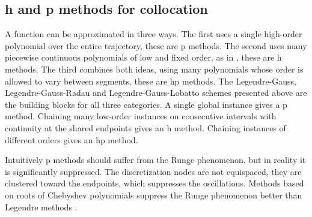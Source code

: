 \subsection{h and p methods for collocation}
A function can be approximated in three ways. The first uses a single high-order polynomial over the entire trajectory, these are p methods. The second uses many piecewise continuous polynomials of low and fixed order, as in \cite{betts}, these are h methods. The third combines both ideas, using many polynomials whose order is allowed to vary between segments, these are hp methods. The Legendre-Gauss, Legendre-Gauss-Radau and Legendre-Gauss-Lobatto schemes presented above are the building blocks for all three categories. A single global instance gives a p method. Chaining many low-order instances on consecutive intervals with continuity at the shared endpoints gives an h method. Chaining instances of different orders gives an hp method.

Intuitively p methods should suffer from the Runge phenomenon, but in reality it is significantly suppressed. The discretization nodes are not equispaced, they are clustered toward the endpoints, which suppresses the oscillations. Methods based on roots of Chebyshev polynomials suppress the Runge phenomenon better than Legendre methods \cite{trefethenApproximationTheoryApproximation}.

